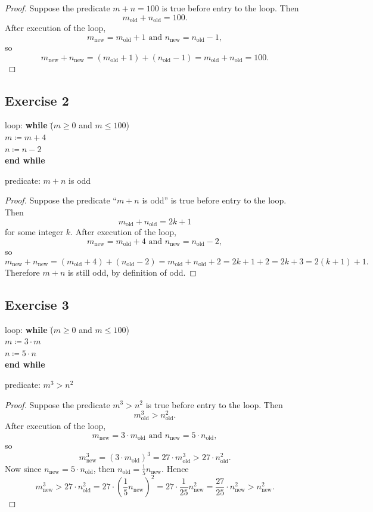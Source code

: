 \documentclass[14pt]{extarticle}
\begin{document}
\begin{proof}
Suppose the predicate $m + n = 100$ is true before entry to the loop. Then 
\[
m_{\text{old}} + n_{\text{old}} = 100.
\]
After execution of the loop,
\[
m_{\text{new}} = m_{\text{old}} + 1 \text{ and } n_{\text{new}} = n_{\text{old}} - 1,
\]
so
\[
m_{\text{new}} + n_{\text{new}} = (m_{\text{old}} + 1) + (n_{\text{old}} - 1)
= m_{\text{old}} + n_{\text{old}} = 100.
\]
\end{proof}

\subsection{Exercise 2}
\begin{tabbing}
loop: \hspace{1cm} 
\= {\bf while} \= ($m \geq 0$ and $m \leq 100$) \\
\>             \> $m \coloneqq m + 4$ \\
\>             \> $n \coloneqq n - 2$ \\
\> {\bf end while} 
\end{tabbing}
predicate: $m + n$ is odd

\begin{proof}
Suppose the predicate ``$m + n$ is odd'' is true before entry to the loop. Then 
\[
m_{\text{old}} + n_{\text{old}} = 2k+1
\]
for some integer $k$. After execution of the loop,
\[
m_{\text{new}} = m_{\text{old}} + 4 \text{ and } n_{\text{new}} = n_{\text{old}} - 2,
\]
so
\[
m_{\text{new}} + n_{\text{new}} = (m_{\text{old}} + 4) + (n_{\text{old}} - 2)
= m_{\text{old}} + n_{\text{old}} + 2 = 2k+1 + 2 = 2k+3 = 2(k+1) + 1.
\]
Therefore $m+n$ is still odd, by definition of odd.
\end{proof}

\subsection{Exercise 3}
\begin{tabbing}
loop: \hspace{1cm} 
\= {\bf while} \= ($m \geq 0$ and $m \leq 100$) \\
\>             \> $m \coloneqq 3 \cdot m$ \\
\>             \> $n \coloneqq 5 \cdot n$ \\
\> {\bf end while} 
\end{tabbing}
predicate: $m^3 > n^2$

\begin{proof}
Suppose the predicate $m^3 > n^2$ is true before entry to the loop. Then
\[
m_{\text{old}}^3 > n_{\text{old}}^2.
\]
After execution of the loop,
\[
m_{\text{new}} = 3 \cdot m_{\text{old}} \text{ and }
n_{\text{new}} = 5 \cdot n_{\text{old}},
\]
so
\[
m_{\text{new}}^3 = (3 \cdot m_{\text{old}})^3 = 27 \cdot m_{\text{old}}^3 > 27 \cdot n_{\text{old}}^2.
\]
Now since $n_{\text{new}} = 5 \cdot n_{\text{old}}$, then
\(n_{\text{old}} = \frac{1}{5}n_{\text{new}}.\)
Hence
\[
m_{\text{new}}^3 > 27 \cdot n_{\text{old}}^2 = 27 \cdot 
\left(\frac{1}{5}n_{\text{new}}\right)^2 = 27 \cdot \frac{1}{25}
n_{\text{new}}^2 = \frac{27}{25} \cdot n_{\text{new}}^2 > n_{\text{new}}^2.
\]
\end{proof}
\end{document}
